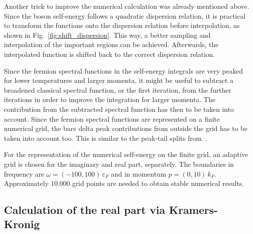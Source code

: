 Another trick to improve the numerical calculation was already mentioned above. Since the boson self-energy follows a quadratic dispersion relation, it is practical to transform the functions onto the dispersion relation before interpolation, as shown in Fig.~\ref{fig:shift_dispersion}. This way, a better sampling and interpolation of the important regions can be achieved. Afterwards, the interpolated function is shifted back to the correct dispersion relation.

Since the fermion spectral functions in the self-energy integrals are very peaked for lower temperatures and larger momenta, it might be useful to subtract a broadened classical spectral function, or the first iteration, from the further iterations in order to improve the integration for larger momenta. The contribution from the subtracted spectral function has then to be taken into account. Since the fermion spectral functions are represented on a finite numerical grid, the bare delta peak contributions from outside the grid has to be taken into account too. This is similar to the peak-tail splits from~\cite{Horak2019}.

For the representation of the numerical self-energy on the finite grid, an adaptive grid is chosen for the imaginary and real part, separately. The boundaries in frequency are $\omega=(-100,100)\,\varepsilon_F$ and in momentum $p=(0,10)\,k_F$. Approximately 10.000 grid points are needed to obtain stable numerical results.


\subsection*{Calculation of the real part via Kramers-Kronig}
\label{subsec:real-part}

